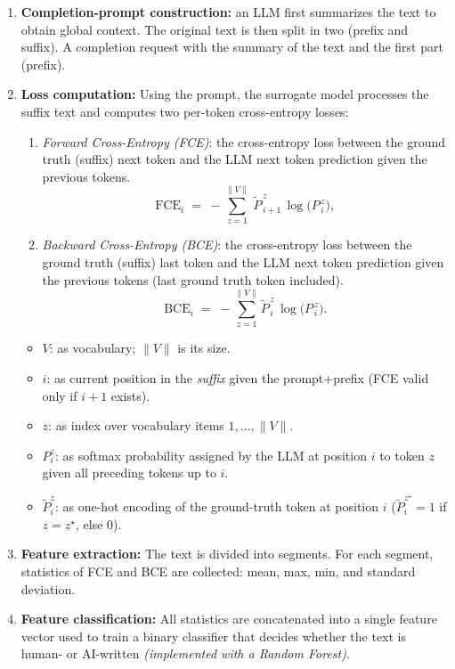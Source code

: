 \begin{enumerate}
    \item \textbf{Completion-prompt construction:} an LLM first summarizes the 
    text to obtain global context. The original text is then split in two (prefix and suffix). 
    A completion request with the summary of the text and the first part (prefix).
    \item \textbf{Loss computation:} Using the prompt, the surrogate model processes 
    the suffix text and computes two per-token cross-entropy losses:

    \begin{enumerate}
        \item \textit{Forward Cross-Entropy (FCE)}:
        the cross-entropy loss between the ground truth (suffix) next token and the LLM next token prediction given the previous tokens.
        \[
        \mathrm{FCE}_i \;=\; - \sum_{z=1}^{\lVert V \rVert} \,\tilde{P}^{\,z}_{\,i+1}\,\log\!\big(P^{\,z}_{\,i}\big),
        \]

        \item \textit{Backward Cross-Entropy (BCE)}: 
        the cross-entropy loss between the ground truth (suffix) last token and the LLM next token prediction given the previous tokens (last ground truth token included).
        \[
        \mathrm{BCE}_i \;=\; - \sum_{z=1}^{\lVert V \rVert} \tilde{P}^{\,z}_{\,i}\,\log\!\big(P^{\,z}_{\,i}\big).
        \]
    \end{enumerate}
    \begin{itemize}
        \item $V$: as vocabulary; $\lVert V\rVert$ is its size.
        \item $i$: as current position in the \emph{suffix} given the prompt+prefix (FCE valid only if $i{+}1$ exists).
        \item $z$: as index over vocabulary items $1,\dots,\lVert V\rVert$.
        \item $P^{z}_{i}$: as softmax probability assigned by the LLM at position $i$ to token $z$ given all preceding tokens up to $i$.
        \item $\tilde{P}^{z}_{i}$: as one-hot encoding of the ground-truth token at position $i$ ($\tilde{P}^{z^\star}_{i}{=}1$ if $z{=}z^\star$, else $0$).
    \end{itemize}
    \item \textbf{Feature extraction:} The text is divided into segments. 
    For each segment, statistics of FCE and BCE are 
    collected: mean, max, min, and standard deviation.

    \item \textbf{Feature classification:} All statistics are concatenated into a 
    single feature vector used to train a binary classifier that decides 
    whether the text is human- or AI-written \textit{(implemented with a Random Forest)}.
\end{enumerate}

